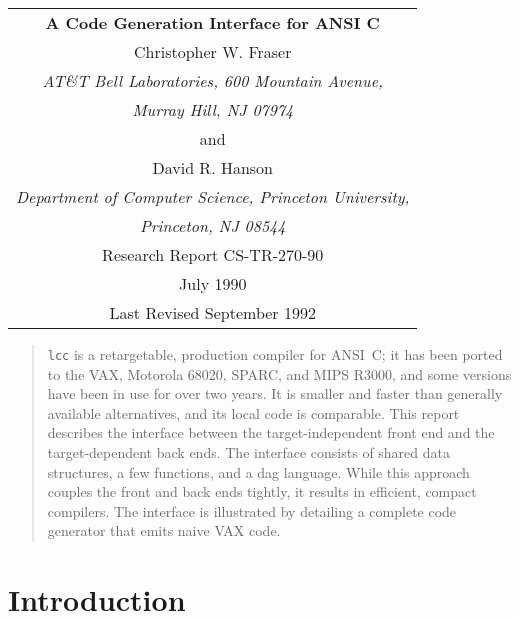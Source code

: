 

\begin{titlepage}
\normalsize
\vspace*{.7in}
\begin{center}
\begin{tabular}{c}
\bf\Large A Code Generation Interface for ANSI C \\[.5in]

Christopher W. Fraser \\
\em AT\&T Bell Laboratories, 600 Mountain Avenue, \\
\em Murray Hill, NJ 07974 \\[1ex]
and \\[1ex]
David R. Hanson \\
\em Department of Computer Science, Princeton University, \\
\em Princeton, NJ 08544 \\[.7in]

Research Report CS-TR-270-90 \\[1ex]
July 1990 \\
Last Revised September 1992 \\[.5in]

\end{tabular}
\end{center}

\begin{abstract}
\normalsize
\verb|lcc| is a retargetable, production compiler for ANSI~C;
it has been ported to the VAX, Motorola 68020, SPARC, and MIPS R3000,
and some versions have been in use for over two years.
It is smaller and faster than generally available alternatives,
and its local code is comparable.
This report describes the interface between the target-independent front end
and the target-dependent back ends.
The interface consists of shared data structures, a few functions,
and a dag language. While this approach couples the front
and back ends tightly, it results in efficient, compact compilers.
The interface is illustrated by detailing a complete code generator
that emits naive VAX code.
\end{abstract}

\end{titlepage}

%

\section{Introduction}

